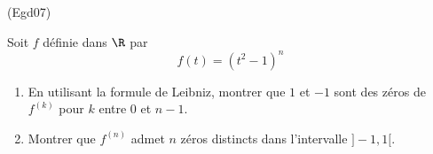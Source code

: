 \begin{tiny}(Egd07)\end{tiny}
Soit $f$ définie dans $\R$ par 
\begin{displaymath}
 f(t) = (t^2 -1)^n
\end{displaymath}
\begin{enumerate}
 \item En utilisant la formule de Leibniz, montrer que $1$ et $-1$ sont des zéros de $f^{(k)}$ pour $k$ entre $0$ et $n-1$.
 \item Montrer que $f^{(n)}$ admet $n$ zéros distincts dans l'intervalle $]-1,1[$.
\end{enumerate}

